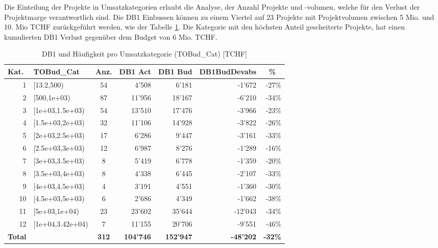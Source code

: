 Die Einteilung der Projekte in Umsatzkategorien erlaubt die Analyse, der Anzahl Projekte und -volumen, welche für den Verlust der Projektmarge verantwortlich sind. Die DB1 Einbussen können zu einem Viertel auf 23 Projekte mit Projektvolumen zwischen 5 Mio. und 10. Mio TCHF zurückgeführt werden, wie der Tabelle \ref{tab:ftobudcat}. Die Kategorie mit den höchsten Anteil gescheiterte Projekte, hat einen kumulierten DB1 Verlust gegenüber dem Budget von 6 Mio. TCHF.
\begin{table}[H]
	\centering
	\caption{DB1 und Häufigkeit pro Umsatzkategorie (TOBud\_Cat) [TCHF]}
	\begin{tabular}{lrcrrrr}
		\toprule
		\multicolumn{1}{l}{\textbf{Kat.}} & \multicolumn{1}{l}{\textbf{TOBud\_Cat}} & \multicolumn{1}{c}{\textbf{ Anz.}} & \multicolumn{1}{l}{\textbf{DB1 Act}} & \multicolumn{1}{l}{\textbf{DB1 Bud }} & \multicolumn{1}{l}{\textbf{DB1BudDevabs}} &  \multicolumn{1}{c}{\textbf{\%}}\\
		\midrule
		\multicolumn{1}{r}{1} & \multicolumn{1}{l}{[13.2,500)} & 54    & 4'508 & 6'181 & -1'672 & -27\% \\
		\multicolumn{1}{r}{2} & \multicolumn{1}{l}{[500,1e+03)} & 87    & 11'956 & 18'167 & -6'210 & -34\% \\
		\multicolumn{1}{r}{3} & \multicolumn{1}{l}{[1e+03,1.5e+03)} & 54    & 13'510 & 17'476 & -3'966 & -23\% \\
		\multicolumn{1}{r}{4} & \multicolumn{1}{l}{[1.5e+03,2e+03)} & 32    & 11'106 & 14'928 & -3'822 & -26\% \\
		\multicolumn{1}{r}{5} & \multicolumn{1}{l}{[2e+03,2.5e+03)} & 17    & 6'286 & 9'447 & -3'161 & -33\% \\
		\multicolumn{1}{r}{6} & \multicolumn{1}{l}{[2.5e+03,3e+03)} & 12    & 6'987 & 8'276 & -1'289 & -16\% \\
		\multicolumn{1}{r}{7} & \multicolumn{1}{l}{[3e+03,3.5e+03)} & 8     & 5'419 & 6'778 & -1'359 & -20\% \\
		\multicolumn{1}{r}{8} & \multicolumn{1}{l}{[3.5e+03,4e+03)} & 8     & 4'338 & 6'445 & -2'107 & -33\% \\
		\multicolumn{1}{r}{9} & \multicolumn{1}{l}{[4e+03,4.5e+03)} & 4     & 3'191 & 4'551 & -1'360 & -30\% \\
		\multicolumn{1}{r}{10} & \multicolumn{1}{l}{[4.5e+03,5e+03)} & 6     & 2'686 & 4'349 & -1'662 & -38\% \\
		\multicolumn{1}{r}{11} & \multicolumn{1}{l}{[5e+03,1e+04)} & 23    & 23'602 & 35'644 & -12'043 & -34\% \\
		\multicolumn{1}{r}{12} & \multicolumn{1}{l}{[1e+04,3.42e+04)} & 7     & 11'155 & 20'706 & -9'551 & -46\% \\
		\bottomrule
		\textbf{Total} &       &    \textbf{312}   & \textbf{104'746} & \textbf{152'947} & \textbf{-48'202} & \textbf{-32\%} \\
	\end{tabular}%
	\label{tab:ftobudcat}%
\end{table}%
